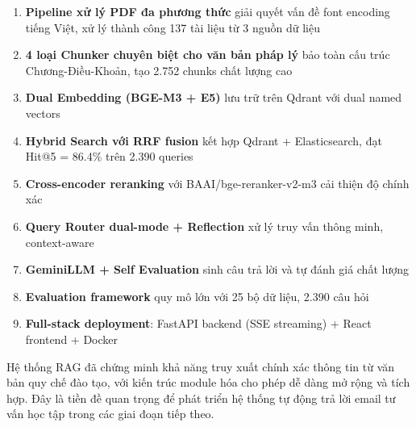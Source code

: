 \documentclass[../DoAn.tex]{subfiles}
\begin{document}
\begin{enumerate}
    \item \textbf{Pipeline xử lý PDF đa phương thức} giải quyết vấn đề font encoding tiếng Việt, xử lý thành công 137 tài liệu từ 3 nguồn dữ liệu
    \item \textbf{4 loại Chunker chuyên biệt cho văn bản pháp lý} bảo toàn cấu trúc Chương-Điều-Khoản, tạo 2.752 chunks chất lượng cao
    \item \textbf{Dual Embedding (BGE-M3 + E5)} lưu trữ trên Qdrant với dual named vectors
    \item \textbf{Hybrid Search với RRF fusion} kết hợp Qdrant + Elasticsearch, đạt Hit@5 = 86.4\% trên 2.390 queries
    \item \textbf{Cross-encoder reranking} với BAAI/bge-reranker-v2-m3 cải thiện độ chính xác
    \item \textbf{Query Router dual-mode + Reflection} xử lý truy vấn thông minh, context-aware
    \item \textbf{GeminiLLM + Self Evaluation} sinh câu trả lời và tự đánh giá chất lượng
    \item \textbf{Evaluation framework} quy mô lớn với 25 bộ dữ liệu, 2.390 câu hỏi
    \item \textbf{Full-stack deployment}: FastAPI backend (SSE streaming) + React frontend + Docker
\end{enumerate}

Hệ thống RAG đã chứng minh khả năng truy xuất chính xác thông tin từ văn bản quy chế đào tạo, với kiến trúc module hóa cho phép dễ dàng mở rộng và tích hợp. Đây là tiền đề quan trọng để phát triển hệ thống tự động trả lời email tư vấn học tập trong các giai đoạn tiếp theo.
\end{document}
